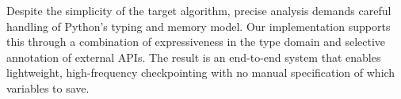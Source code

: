 Despite the simplicity of the target algorithm, precise analysis demands careful handling of Python's typing and memory model. Our implementation supports this through a combination of expressiveness in the type domain and selective annotation of external APIs. The result is an end-to-end system that enables lightweight, high-frequency checkpointing with no manual specification of which variables to save.
